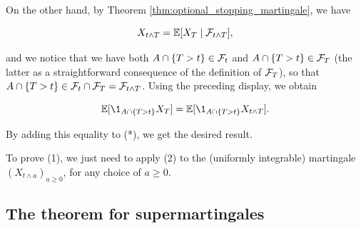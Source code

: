 \documentclass[../Main.tex]{subfiles}
\begin{document}
{    On the other hand, by Theorem \ref{thm:optional_stopping_martingale}, we have

    $$X_{t \wedge T} = \mathbb{E}[X_T \mid \mathcal{F}_{t \wedge T}],$$

    and we notice that we have both $A \cap \{T > t\} \in \mathcal{F}_t$ and $A \cap \{T > t\} \in \mathcal{F}_T$ (the latter as a straightforward consequence of the definition of $\mathcal{F}_T$), so that $A \cap \{T > t\} \in \mathcal{F}_t \cap \mathcal{F}_T = \mathcal{F}_{t \wedge T}$. Using the preceding display, we obtain

    $$\EE[\1_{A \cap \{T > t\}} X_T] = \EE[\1_{A \cap \{T > t\}} X_{t \wedge T}].$$

    By adding this equality to (*), we get the desired result.

    To prove (1), we just need to apply (2) to the (uniformly integrable) martingale $(X_{t \wedge a})_{a \geq 0}$, for any choice of $a \geq 0$. 
}


\subsection{The theorem for supermartingales}
\end{document}
